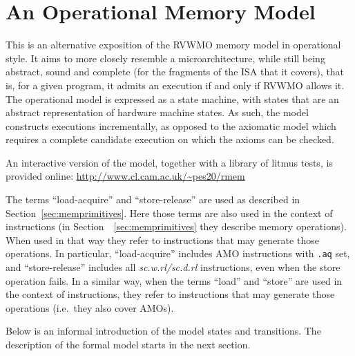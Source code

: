 \section{An Operational Memory Model}


This is an alternative exposition of the RVWMO memory model in operational style.
It aims to more closely resemble a microarchitecture, while still being abstract, sound and complete (for the fragments of the ISA that it covers), that is, for a given program, it admits an execution if and only if RVWMO allows it.
The operational model is expressed as a state machine, with states that are an abstract representation of hardware machine states.
As such, the model constructs executions incrementally, as opposed to the axiomatic model which requires a complete candidate execution on which the axioms can be checked.

An interactive version of the model, together with a library of litmus tests,
is provided online: \url{http://www.cl.cam.ac.uk/~pes20/rmem}

The terms ``load-acquire'' and ``store-release'' are used as described in Section~\ref{sec:memprimitives}.
Here those terms are also used in the context of instructions (in Section~~\ref{sec:memprimitives} they describe memory operations).
When used in that way they refer to instructions that may generate those operations.
In particular, ``load-acquire'' includes AMO instructions with {\tt .aq} set, and ``store-release'' includes all {\em sc.w.rl/sc.d.rl} instructions, even when the store operation fails.
In a similar way, when the terms ``load'' and ``store'' are used in the context of instructions, they refer to instructions that may generate those operations (i.e.~they also cover AMOs).

Below is an informal introduction of the model states and transitions.
The description of the formal model starts in the next section.

